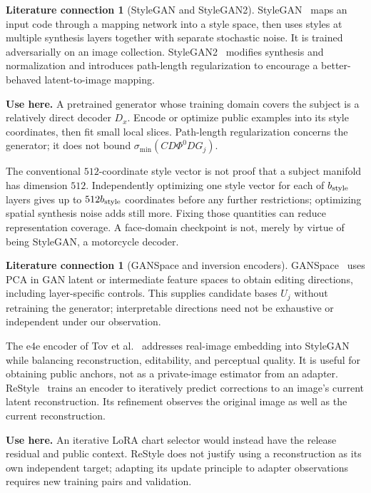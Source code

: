 \documentclass[11pt,a4paper]{article}
\theoremstyle{definition}
\theoremstyle{definition}
\newtheorem{literature}[theorem]{Literature connection}
\theoremstyle{remark}\newtheorem{remark}[theorem]{Remark}
\newcommand{\smin}{\sigma_{\min}}\newcommand{\smax}{\sigma_{\max}}
\begin{document}
\begin{literature}[StyleGAN and StyleGAN2]\label{lit:stylegan}
StyleGAN~\cite{stylegan} maps an input code through a mapping network into a style space, then uses styles at multiple synthesis layers together with separate stochastic noise. It is trained adversarially on an image collection. StyleGAN2~\cite{stylegan2} modifies synthesis and normalization and introduces path-length regularization to encourage a better-behaved latent-to-image mapping.

\textbf{Use here.} A pretrained generator whose training domain covers the subject is a relatively direct decoder $D_x$. Encode or optimize public examples into its style coordinates, then fit small local slices. Path-length regularization concerns the generator; it does not bound $\smin(CD\Phi^0DG_j)$.

The conventional $512$-coordinate style vector is not proof that a subject manifold has dimension $512$. Independently optimizing one style vector for each of $b_{\rm style}$ layers gives up to $512b_{\rm style}$ coordinates before any further restrictions; optimizing spatial synthesis noise adds still more. Fixing those quantities can reduce representation coverage. A face-domain checkpoint is not, merely by virtue of being StyleGAN, a motorcycle decoder.
\end{literature}

\begin{literature}[GANSpace and inversion encoders]\label{lit:gancontrols}
GANSpace~\cite{ganspace} uses PCA in GAN latent or intermediate feature spaces to obtain editing directions, including layer-specific controls. This supplies candidate bases $U_j$ without retraining the generator; interpretable directions need not be exhaustive or independent under our observation.

The e4e encoder of Tov et al.~\cite{e4e} addresses real-image embedding into StyleGAN while balancing reconstruction, editability, and perceptual quality. It is useful for obtaining public anchors, not as a private-image estimator from an adapter. ReStyle~\cite{restyle} trains an encoder to iteratively predict corrections to an image's current latent reconstruction. Its refinement observes the original image as well as the current reconstruction.

\textbf{Use here.} An iterative LoRA chart selector would instead have the release residual and public context. ReStyle does not justify using a reconstruction as its own independent target; adapting its update principle to adapter observations requires new training pairs and validation.
\end{literature}
\end{document}
